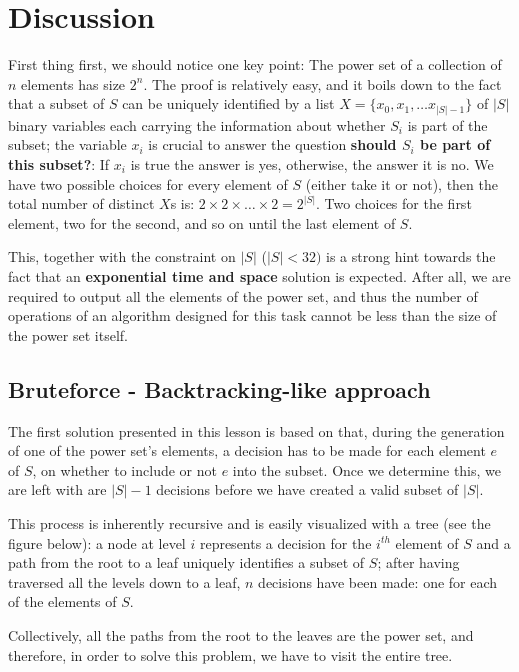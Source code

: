 \section{Discussion}
\label{sec:powerset:discussion}

First thing first, we should notice one key point: The power set of a collection of $n$ elements has size $2^n$. The proof  is relatively easy, and it boils down to the fact that a subset of $S$ can be uniquely identified by a list $X=\{x_0,x_1,\ldots x_{|S|-1}\}$ of $|S|$ binary variables each carrying the information about whether $S_i$ is part of the subset; the variable $x_i$ is crucial to answer the question \textbf{should $S_i$ be part of this subset?}: If $x_i$ is true the answer is yes, otherwise, the answer it is no.
We have two possible choices for every element of $S$ (either take it or not), then the total number of distinct $X$s  is: $2 \times 2 \times \ldots \times 2 = 2^{|S|}$. Two choices for the first element, two for the second, and so
on until the last element of $S$.
  
This, together with the constraint on $|S|$ ($|S| < 32)$ is a strong hint towards the fact that an \textbf{exponential time and space} solution is expected.
After all, we are required to output all the elements of the power set, and thus the number of operations of an algorithm designed for this task cannot be less than the size of the power set itself. 



\subsection{Bruteforce - Backtracking-like approach}

The first solution presented in this lesson is based on that,  during the generation of
one of the power set's elements, a decision has to be made for each element $e$ of $S$, on whether to include or not $e$ into the subset.
Once we determine this, we are left with are $|S|-1$ decisions
before we have created a valid subset of $|S|$.

This process is inherently recursive and is easily visualized with a tree (see the figure below): a node at level $i$
represents a decision for the $i^{th}$ element of $S$ and a path from the root to a leaf uniquely
identifies a subset of $S$; after having traversed all the levels down to a leaf, $n$ decisions have been made: 
one for each of the elements of $S$. 

Collectively, all the paths from the root to the leaves are the power set, and therefore, in
order to solve this problem, we have to visit the entire tree.


